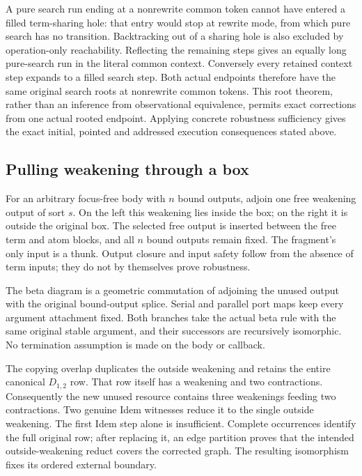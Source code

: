 A pure search run ending at a nonrewrite common token cannot have entered
a filled term-sharing hole: that entry would stop at rewrite mode, from
which pure search has no transition. Backtracking out of a sharing hole is
also excluded by operation-only reachability. Reflecting the remaining
steps gives an equally long pure-search run in the literal common context.
Conversely every retained context step expands to a filled search step.
Both actual endpoints therefore have the same original search roots at
nonrewrite common tokens. This root theorem, rather than an inference from
observational equivalence, permits exact corrections from one actual rooted
endpoint. Applying concrete robustness sufficiency gives the exact initial,
pointed and addressed execution consequences stated above.


\par{}

\subsection{Pulling weakening through a box}
For an arbitrary focus-free body with $n$ bound outputs, adjoin one free
weakening output of sort $s$. On the left this weakening lies inside the
box; on the right it is outside the original box. The selected free output
is inserted between the free term and atom blocks, and all $n$ bound outputs
remain fixed. The fragment's only input is a thunk. Output closure and
input safety follow from the absence of term inputs; they do not by
themselves prove robustness.

The beta diagram is a geometric commutation of adjoining the unused output
with the original bound-output splice. Serial and parallel port maps keep
every argument attachment fixed. Both branches take the actual beta rule
with the same original stable argument, and their successors are recursively
isomorphic. No termination assumption is made on the body or callback.

The copying overlap duplicates the outside weakening and retains the entire
canonical $D_{1,2}$ row. That row itself has a weakening and two contractions.
Consequently the new unused resource contains three weakenings feeding two
contractions. Two genuine Idem witnesses reduce it to the single outside
weakening. The first Idem step alone is insufficient. Complete occurrences
identify the full original row; after replacing it, an edge partition proves
that the intended outside-weakening reduct covers the corrected graph.
The resulting isomorphism fixes its ordered external boundary.


